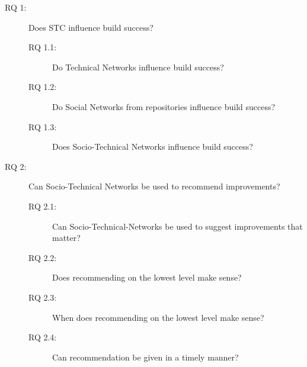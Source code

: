 

\begin{description}
% 
\item[RQ 1:] Does STC influence build success?
  \begin{description}
  \item[RQ 1.1:] Do Technical Networks influence build success?
  \item[RQ 1.2:] Do Social Networks from repositories influence build success?
  \item[RQ 1.3:] Does Socio-Technical Networks influence build success?
  \end{description}
%
%
\item[RQ 2:] Can Socio-Technical Networks be used to recommend improvements? 
  \begin{description}
  \item[RQ 2.1:] Can Socio-Technical-Networks be used to suggest improvements that matter?
  \item[RQ 2.2:] Does recommending on the lowest level make sense?
  \item[RQ 2.3:] When does recommending on the lowest level make sense?
  \item[RQ 2.4:] Can recommendation be given in a timely manner?
  \end{description}
\end{description}
